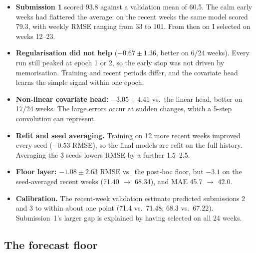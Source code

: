 \begin{itemize}
  \item \textbf{Submission 1} scored 93.8 against a validation mean of 60.5. The calm early weeks had flattered the average: on the recent weeks the same model scored 79.3, with weekly RMSE ranging from 33 to 101. From then on I selected on weeks 12--23.
  \item \textbf{Regularisation did not help} ($+0.67 \pm 1.36$, better on 6/24 weeks). Every run still peaked at epoch 1 or 2, so the early stop was not driven by memorisation. Training and recent periods differ, and the covariate head learns the simple signal within one epoch.
  \item \textbf{Non-linear covariate head:} $-3.05 \pm 4.41$ vs.\ the linear head, better on 17/24 weeks. The large errors occur at sudden changes, which a 5-step convolution can represent.
  \item \textbf{Refit and seed averaging.} Training on 12 more recent weeks improved every seed ($-0.53$ RMSE), so the final models are refit on the full history. Averaging the 3 seeds lowers RMSE by a further 1.5--2.5.
  \item \textbf{Floor layer:} $-1.08 \pm 2.63$ RMSE vs.\ the post-hoc floor, but $-3.1$ on the seed-averaged recent weeks (71.40 $\to$ 68.34), and MAE 45.7 $\to$ 42.0.
  \item \textbf{Calibration.} The recent-week validation estimate predicted submissions 2 and 3 to within about one point (71.4 vs.\ 71.48; 68.3 vs.\ 67.22). Submission~1's larger gap is explained by having selected on all 24 weeks.
\end{itemize}

\subsection*{The forecast floor}

